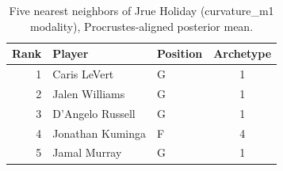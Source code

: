 \begin{table}[htbp]
  \centering\small
  \begin{tabular}{rllc}
    \toprule
    Rank & Player & Position & Archetype \\
    \midrule
    1 & Caris LeVert & G & 1 \\
    2 & Jalen Williams & G & 1 \\
    3 & D'Angelo Russell & G & 1 \\
    4 & Jonathan Kuminga & F & 4 \\
    5 & Jamal Murray & G & 1 \\
    \bottomrule
  \end{tabular}
  \caption{Five nearest neighbors of Jrue Holiday (curvature_m1 modality), Procrustes-aligned posterior mean.}
  \label{tab:Jrue_Holiday_neighbors_curvature_m1}
\end{table}

